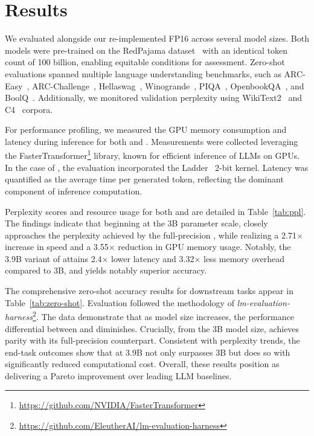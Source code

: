 \section{Results}

We evaluated  alongside our re-implemented FP16  across several model sizes. Both models were pre-trained on the RedPajama dataset~\cite{redpajama} with an identical token count of 100 billion, enabling equitable conditions for assessment. Zero-shot evaluations spanned multiple language understanding benchmarks, such as ARC-Easy~\cite{arc}, ARC-Challenge~\cite{arc}, Hellaswag~\cite{hellaswag}, Winogrande~\cite{winoGrande}, PIQA~\cite{piqa}, OpenbookQA~\cite{openbookqa}, and BoolQ~\cite{boolq}. Additionally, we monitored validation perplexity using WikiText2~\cite{wikitext2} and C4~\cite{c4} corpora.

For performance profiling, we measured the GPU memory consumption and latency during inference for both  and . Measurements were collected leveraging the FasterTransformer\footnote{\url{https://github.com/NVIDIA/FasterTransformer}} library, known for efficient inference of LLMs on GPUs. In the case of , the evaluation incorporated the Ladder~\cite{ladder} 2-bit kernel. Latency was quantified as the average time per generated token, reflecting the dominant component of inference computation.

Perplexity scores and resource usage for both  and  are detailed in Table~\ref{tab:ppl}. The findings indicate that beginning at the 3B parameter scale,  closely approaches the perplexity achieved by the full-precision , while realizing a 2.71$\times$ increase in speed and a 3.55$\times$ reduction in GPU memory usage. Notably, the 3.9B variant of  attains 2.4$\times$ lower latency and 3.32$\times$ less memory overhead compared to  3B, and yields notably superior accuracy.

The comprehensive zero-shot accuracy results for downstream tasks appear in Table~\ref{tab:zero-shot}. Evaluation followed the methodology of \emph{lm-evaluation-harness}\footnote{\url{https://github.com/EleutherAI/lm-evaluation-harness}}. The data demonstrate that as model size increases, the performance differential between  and  diminishes. Crucially, from the 3B model size,  achieves parity with its full-precision counterpart. Consistent with perplexity trends, the end-task outcomes show that  at 3.9B not only surpasses  3B but does so with significantly reduced computational cost. Overall, these results position  as delivering a Pareto improvement over leading LLM baselines.

